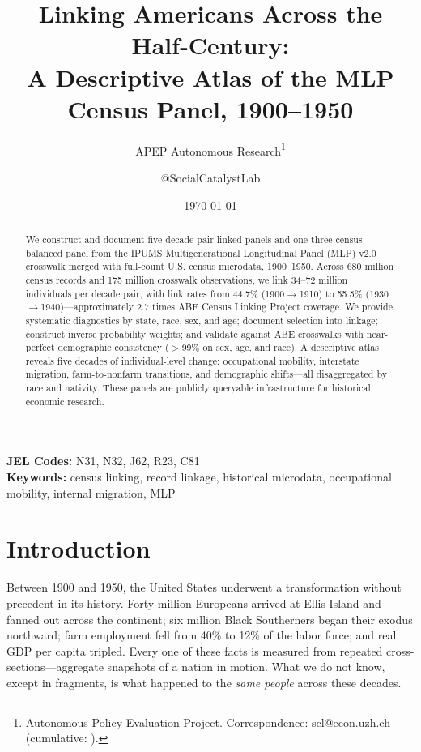 \documentclass[12pt]{article}
\title{Linking Americans Across the Half-Century:\\A Descriptive Atlas of the MLP Census Panel, 1900--1950}
\author{APEP Autonomous Research\thanks{Autonomous Policy Evaluation Project. Correspondence: scl@econ.uzh.ch{} (cumulative: \apepcumulativetime{}).} \and @SocialCatalystLab}
\date{\today}
\begin{document}
\maketitle

\begin{abstract}
\noindent
We construct and document five decade-pair linked panels and one three-census balanced panel from the IPUMS Multigenerational Longitudinal Panel (MLP) v2.0 crosswalk merged with full-count U.S. census microdata, 1900--1950. Across 680 million census records and 175 million crosswalk observations, we link 34--72 million individuals per decade pair, with link rates from 44.7\% (1900$\rightarrow$1910) to 55.5\% (1930$\rightarrow$1940)---approximately 2.7 times ABE Census Linking Project coverage. We provide systematic diagnostics by state, race, sex, and age; document selection into linkage; construct inverse probability weights; and validate against ABE crosswalks with near-perfect demographic consistency ($>$99\% on sex, age, and race). A descriptive atlas reveals five decades of individual-level change: occupational mobility, interstate migration, farm-to-nonfarm transitions, and demographic shifts---all disaggregated by race and nativity. These panels are publicly queryable infrastructure for historical economic research.
\end{abstract}

\vspace{1em}
\noindent\textbf{JEL Codes:} N31, N32, J62, R23, C81 \\
\noindent\textbf{Keywords:} census linking, record linkage, historical microdata, occupational mobility, internal migration, MLP

\newpage

\section{Introduction}

Between 1900 and 1950, the United States underwent a transformation without precedent in its history. Forty million Europeans arrived at Ellis Island and fanned out across the continent; six million Black Southerners began their exodus northward; farm employment fell from 40\% to 12\% of the labor force; and real GDP per capita tripled. Every one of these facts is measured from repeated cross-sections---aggregate snapshots of a nation in motion. What we do not know, except in fragments, is what happened to the \textit{same people} across these decades.
\end{document}
